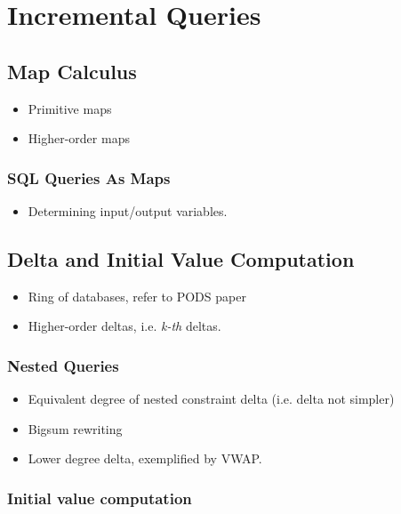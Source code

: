 \section{Incremental Queries}

\subsection{Map Calculus}

\begin{itemize}
  \item Primitive maps
  \item Higher-order maps 
\end{itemize}

\subsubsection{SQL Queries As Maps}
\begin{itemize}
  \item Determining input/output variables.
\end{itemize}

\subsection{Delta and Initial Value Computation}

\begin{itemize}
  \item Ring of databases, refer to PODS paper
  \item Higher-order deltas, i.e. \textit{k-th} deltas.
\end{itemize}

\subsubsection{Nested Queries}

\begin{itemize}
  \item Equivalent degree of nested constraint delta (i.e. delta not simpler)
  \item Bigsum rewriting
  \item Lower degree delta, exemplified by VWAP.
\end{itemize}

\subsubsection{Initial value computation}

